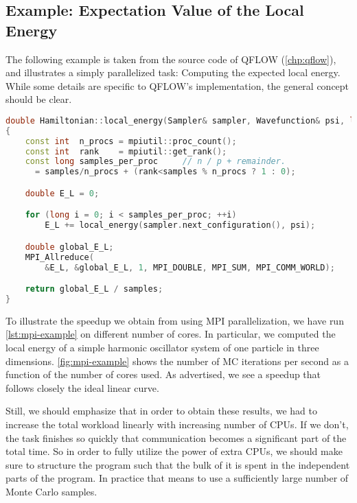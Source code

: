 \documentclass[Thesis.tex]{subfiles}
\begin{document}
\subsection{Example: Expectation Value of the Local Energy}

The following example is taken from the source code of QFLOW (\cref{chp:qflow}),
and illustrates a simply parallelized task: Computing the expected local energy.
While some details are specific to QFLOW's implementation, the general concept
should be clear.

\begin{center}
\begin{lstlisting}[language=C++, caption={Example excerpt
from the source code of QFLOW~\cite{qflow}, showing an MPI parallelized
computation of the expected local energy.}, label={lst:mpi-example}]
double Hamiltonian::local_energy(Sampler& sampler, Wavefunction& psi, long samples) const
{
    const int  n_procs = mpiutil::proc_count();
    const int  rank    = mpiutil::get_rank();
    const long samples_per_proc     // n / p + remainder.
      = samples/n_procs + (rank<samples % n_procs ? 1 : 0);

    double E_L = 0;

    for (long i = 0; i < samples_per_proc; ++i)
        E_L += local_energy(sampler.next_configuration(), psi);

    double global_E_L;
    MPI_Allreduce(
        &E_L, &global_E_L, 1, MPI_DOUBLE, MPI_SUM, MPI_COMM_WORLD);

    return global_E_L / samples;
}
\end{lstlisting}
\end{center}
To illustrate the speedup we obtain from using MPI parallelization, we have run
\cref{lst:mpi-example} on different number of cores. In particular, we computed
the local energy of a simple harmonic oscillator system of one particle in three
dimensions. \cref{fig:mpi-example} shows the number of MC iterations per second
as a function of the number of cores used. As advertised, we see a speedup that
follows closely the ideal linear curve.

Still, we should emphasize that in order to obtain these results, we had to
increase the total workload linearly with increasing number of CPUs. If we
don't, the task finishes so quickly that communication becomes a significant
part of the total time. So in order to fully utilize the power
of extra CPUs, we should make sure to structure the program such that the bulk of
it is spent in the independent parts of the program. In practice that means to
use a sufficiently large number of Monte Carlo samples.
\end{document}
